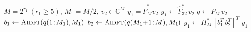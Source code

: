 \begin{algorithm}[!t]
\caption{$\mathit{Aidft}$: $y_1 = \hat{F}^{*}_M v_2$}\label{alg:aidft}
\begin{algorithmic}[1]
\Require $M=2^{r_1}\ (r_1\ge5)$, $M_1=M/2$, $v_2\in\mathbb{C}^M$
\Ensure $y_1 = \hat{F}^{*}_M v_2$
    \State $y_1 \gets \hat{F}^{*}_{32}\, v_2$
  \EndIf
    \State $q \gets P_M\, v_2$
    \State $b_1 \gets \Call{Aidft}{q(1\!:\!M_1), M_1}$
    \State $b_2 \gets \Call{Aidft}{q(M_1\!+\!1\!:\!M), M_1}$
    \State $y_1 \gets H^{*}_M\,[b_1^T\ b_2^T]^T$
  \EndIf
  \State \Return $y_1$
\EndFunction
\end{algorithmic}
\end{algorithm}
